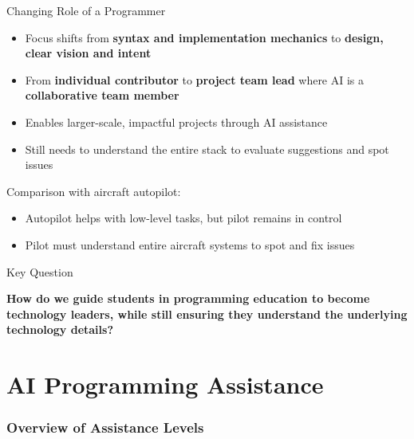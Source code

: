 \documentclass[xcolor=dvipsnames, aspectratio=169]{beamer}
\begin{document}
\begin{frame}{Changing Role of a Programmer}
  \begin{itemize}
    \item Focus shifts from \textbf{syntax and implementation mechanics} to \textbf{design, clear vision and intent}
    \item From \textbf{individual contributor} to \textbf{project team lead} where AI is a \textbf{collaborative team member}
    \item Enables larger-scale, impactful projects through AI assistance
    \item Still needs to understand the entire stack to evaluate suggestions and spot issues
  \end{itemize}
  
  \begin{alertbox}
    Comparison with aircraft autopilot:
    \begin{itemize}
      \item Autopilot helps with low-level tasks, but pilot remains in control
      \item Pilot must understand entire aircraft systems to spot and fix issues
    \end{itemize}
  \end{alertbox}
\end{frame}

\begin{frame}{Key Question}
  \begin{center}
    \large\textbf{How do we guide students in programming education to become technology leaders, while still ensuring they understand the underlying technology details?}
  \end{center}
\end{frame}

\part[AI Programming Assistance]{AI Programming Assistance}
\section{Overview of Assistance Levels}
\end{document}
